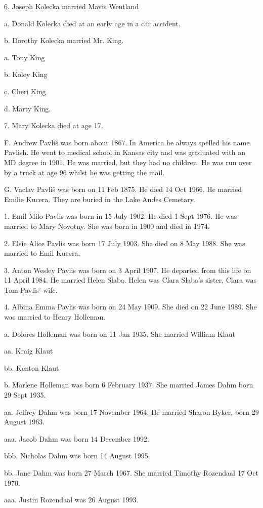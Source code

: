 \documentclass[a4paper]{article}
\begin{document}
6. Joseph Kolecka married Mavis Wentland

a. Donald Kolecka died  at an early age in a car accident.

b. Dorothy Kolecka married Mr. King.

a. Tony King

b. Koley King

c. Cheri King

d. Marty King.  

7. Mary Kolecka died at age 17.

F. Andrew Pavli\v{s} was born about 1867. In America he always spelled his name Pavlish.  He went to medical school in Kansas city and was graduated with an MD degree in 1901.  He was married, but they had no children.  He was run over by a truck at age 96 whilst he was getting the mail.

G. Vaclav Pavli\v{s} was born on 11 Feb 1875.  He died 14 Oct 1966.  He married Emilie Kucera.  They are buried in the Lake Andes Cemetary.    

1. Emil Milo Pavlis was born in 15 July 1902.  He died  1 Sept 1976.  He was married to Mary Novotny. She was born in 1900 and died in 1974.

2. Elsie Alice Pavlis was born 17 July 1903.  She died on 8 May 1988.  She was married to Emil Kucera.

3. Anton Wesley Pavlis was born on 3 April 1907.  He departed from this life on 11 April 1984.  He married Helen Slaba. Helen was Clara Slaba's sister, Clara was Tom Pavlis' wife. 

4. Albina Emma Pavlis was born on 24 May 1909.  She died on 22 June 1989. She was married to Henry Holleman.

a. Dolores Holleman was born on 11 Jan 1935.  She married William Klaut

aa. Kraig Klaut

bb. Kenton Klaut

b. Marlene Holleman was born 6 February 1937.  She married James Dahm born 29 Sept 1935.

aa. Jeffrey Dahm was born 17 November 1964. He married Sharon Byker, born 29 August 1963.

aaa. Jacob Dahm was born 14 December 1992.

bbb. Nicholas Dahm was born 14 August 1995.

bb. Jane Dahm was born 27 March 1967.  She married Timothy Rozendaal 17 Oct 1970. 

aaa. Justin Rozendaal was 26 August 1993.
\end{document}
